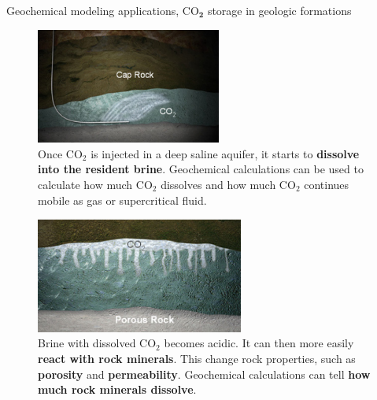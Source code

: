 %
\begin{frame}{Geochemical modeling applications, 
CO$_{\boldsymbol{2}}$ storage in geologic formations}
%
\vskip 10pt
\lcol
%
\begin{figure}
\includegraphics[height=3.8cm]{figures/applications/co2-storage-injection}
\caption*{Once CO$_{2}$ is injected in a deep saline aquifer, it starts to
\textbf{dissolve into the resident brine}. Geochemical calculations
can be used to calculate how much CO$_{2}$ dissolves and how much
CO$_{2}$ continues mobile as gas or supercritical fluid.}
\end{figure}
%
\rcol
%
\begin{figure}
\includegraphics[height=3.8cm]{figures/applications/co2-storage-fingers}
\caption*{Brine with dissolved CO$_{2}$ becomes acidic. It can then more easily 
\textbf{react with rock minerals}. This change rock properties, such as \textbf{porosity} 
and \textbf{permeability}. Geochemical calculations can tell {\bf how much rock 
minerals dissolve}.}
\end{figure}
%
\ecol
%
\end{frame}
%
%
